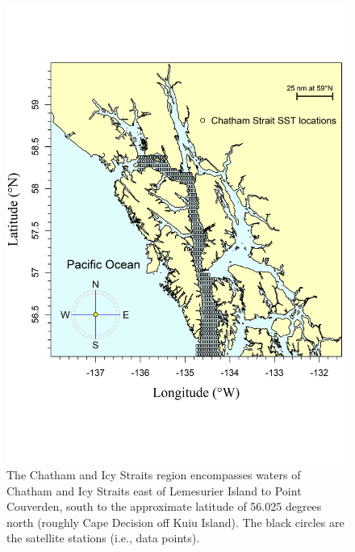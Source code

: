\documentclass[
]{article}
\begin{document}
\begin{figure}
\centering
\includegraphics{../../2024_forecast/results/temperature_data/Chatham.png}
\caption{The Chatham and Icy Straits region encompasses waters of
Chatham and Icy Straits east of Lemesurier Island to Point Couverden,
south to the approximate latitude of 56.025 degrees north (roughly Cape
Decision off Kuiu Island). The black circles are the satellite stations
(i.e., data points).}
\end{figure}
\end{document}
